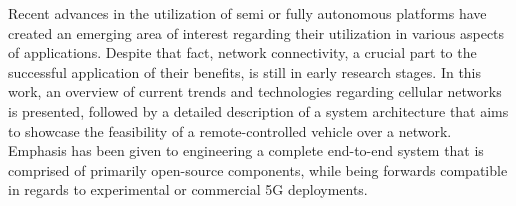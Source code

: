 % 
% 
%
Recent advances in the utilization of semi or fully autonomous platforms have created an emerging area of interest regarding their utilization in various aspects of  applications. Despite that fact, network connectivity, a crucial part to the successful application of their benefits, is still in early research stages. 
In this work, an overview of current trends and technologies regarding cellular networks is presented, followed by a detailed description of a system architecture that aims to showcase the feasibility of a remote-controlled vehicle over a network. Emphasis has been given to engineering a complete end-to-end system that is comprised of primarily open-source components, while being forwards compatible in regards to experimental or commercial 5G deployments.